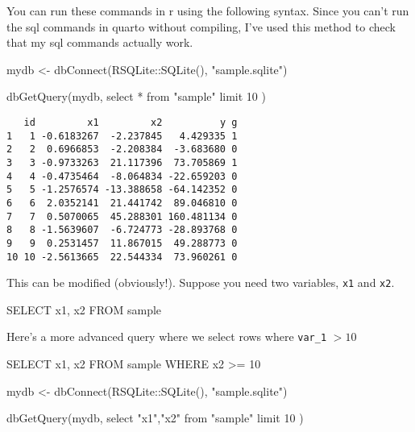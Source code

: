 \documentclass[
  letterpaper,
  DIV=11,
  numbers=noendperiod]{scrreprt}
\newenvironment{Shaded}{\begin{snugshade}}{\end{snugshade}}
\newcommand{\DecValTok}[1]{\textcolor[rgb]{0.68,0.00,0.00}{#1}}
\newcommand{\FunctionTok}[1]{\textcolor[rgb]{0.28,0.35,0.67}{#1}}
\newcommand{\KeywordTok}[1]{\textcolor[rgb]{0.00,0.23,0.31}{#1}}
\newcommand{\NormalTok}[1]{\textcolor[rgb]{0.00,0.23,0.31}{#1}}
\newcommand{\OperatorTok}[1]{\textcolor[rgb]{0.37,0.37,0.37}{#1}}
\newcommand{\OtherTok}[1]{\textcolor[rgb]{0.00,0.23,0.31}{#1}}
\newcommand{\SpecialCharTok}[1]{\textcolor[rgb]{0.37,0.37,0.37}{#1}}
\newcommand{\StringTok}[1]{\textcolor[rgb]{0.13,0.47,0.30}{#1}}
\begin{document}
You can run these commands in r using the following syntax. Since you
can't run the sql commands in quarto without compiling, I've used this
method to check that my sql commands actually work.

\begin{Shaded}
\begin{Highlighting}[]
\NormalTok{mydb }\OtherTok{\textless{}{-}} \FunctionTok{dbConnect}\NormalTok{(RSQLite}\SpecialCharTok{::}\FunctionTok{SQLite}\NormalTok{(), }\StringTok{"sample.sqlite"}\NormalTok{)}

\FunctionTok{dbGetQuery}\NormalTok{(mydb,}\StringTok{\textquotesingle{}}
\StringTok{  select *}
\StringTok{  from "sample"}
\StringTok{  limit 10}
\StringTok{\textquotesingle{}}\NormalTok{)}
\end{Highlighting}
\end{Shaded}

\begin{verbatim}
   id         x1         x2          y g
1   1 -0.6183267  -2.237845   4.429335 1
2   2  0.6966853  -2.208384  -3.683680 0
3   3 -0.9733263  21.117396  73.705869 1
4   4 -0.4735464  -8.064834 -22.659203 0
5   5 -1.2576574 -13.388658 -64.142352 0
6   6  2.0352141  21.441742  89.046810 0
7   7  0.5070065  45.288301 160.481134 0
8   8 -1.5639607  -6.724773 -28.893768 0
9   9  0.2531457  11.867015  49.288773 0
10 10 -2.5613665  22.544334  73.960261 0
\end{verbatim}

This can be modified (obviously!). Suppose you need two variables,
\texttt{x1} and \texttt{x2}.

\begin{Shaded}
\begin{Highlighting}[]
\KeywordTok{SELECT}\NormalTok{ x1, x2}
\KeywordTok{FROM} \KeywordTok{sample}
\end{Highlighting}
\end{Shaded}

Here's a more advanced query where we select rows where \texttt{var\_1}
\(> 10\)

\begin{Shaded}
\begin{Highlighting}[]
\KeywordTok{SELECT}\NormalTok{ x1, x2}
\KeywordTok{FROM} \KeywordTok{sample}
\KeywordTok{WHERE}\NormalTok{ x2 }\OperatorTok{\textgreater{}=} \DecValTok{10}
\end{Highlighting}
\end{Shaded}

\begin{Shaded}
\begin{Highlighting}[]
\NormalTok{mydb }\OtherTok{\textless{}{-}} \FunctionTok{dbConnect}\NormalTok{(RSQLite}\SpecialCharTok{::}\FunctionTok{SQLite}\NormalTok{(), }\StringTok{"sample.sqlite"}\NormalTok{)}

\FunctionTok{dbGetQuery}\NormalTok{(mydb,}\StringTok{\textquotesingle{}}
\StringTok{  select "x1","x2"}
\StringTok{  from "sample"}
\StringTok{  limit 10}
\StringTok{\textquotesingle{}}\NormalTok{)}
\end{Highlighting}
\end{Shaded}
\end{document}

